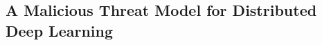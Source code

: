 \documentclass[conference]{IEEEtran}
\begin{document}

















\subsection{A Malicious Threat Model for Distributed Deep Learning}\label{sec:threatModel}
\end{document}

